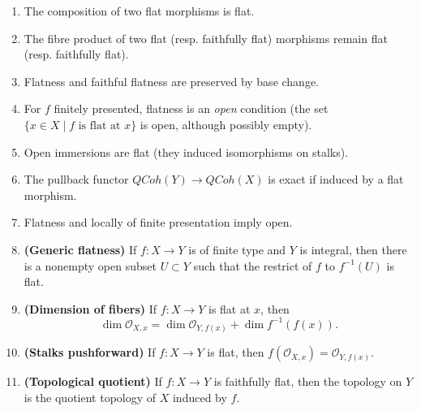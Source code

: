 \documentclass{amsart}
\theoremstyle{definition}
\theoremstyle{remark}
\begin{document}
\begin{enumerate}
    \item The composition of two flat morphisms is flat.
    \item The fibre product of two flat (resp. faithfully flat) morphisms remain
        flat (resp. faithfully flat).
    \item Flatness and faithful flatness are preserved by base change.
    \item For $f$ finitely presented, flatness is an \textit{open} condition
        (the set $\{x \in X \mid f \text{ is flat at } x \}$ is open, although
        possibly empty).
    \item Open immersions are flat (they induced isomorphisms on stalks).
    \item The pullback functor $\mathit{QCoh}(Y) \to \mathit{QCoh}(X)$ is
        exact if induced by a flat morphism.
    \item Flatness and locally of finite presentation imply open.
    \item \textbf{(Generic flatness)} If $f : X \to Y$ is of finite type and $Y$
        is integral, then there is a nonempty open subset $U \subset Y$ such
        that the restrict of $f$ to $f^{-1}(U)$ is flat.
    \item \textbf{(Dimension of fibers)} If $f : X \to Y$ is flat at $x$, then
        \[
            \dim \mathcal{O}_{X, x} = \dim \mathcal{O}_{Y, f(x)} + \dim
            f^{-1}(f(x)).
        \]
    \item \textbf{(Stalks pushforward)} If $f : X \to Y$ is flat, then
        $f(\mathcal{O}_{X, x}) = \mathcal{O}_{Y, f(x)}$.

    \item \textbf{(Topological quotient)} If $f : X \to Y$ is faithfully flat,
        then the topology on $Y$ is the quotient topology of $X$ induced by $f$.
\end{enumerate}
\end{document}
